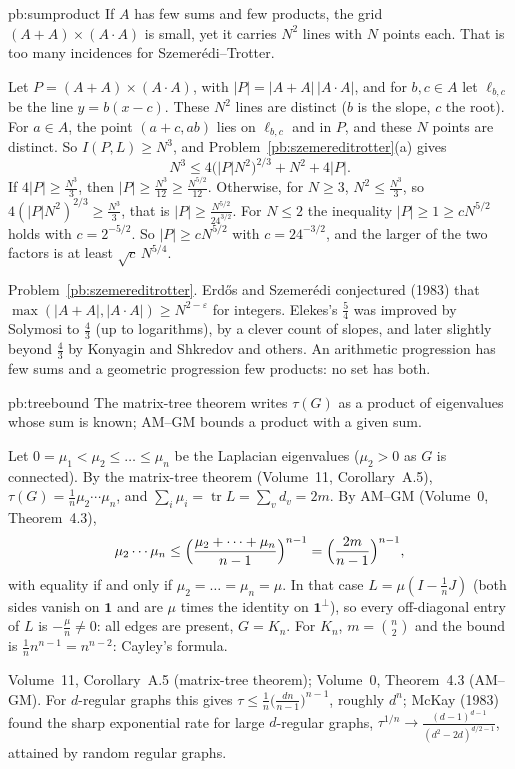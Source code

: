 \begin{solution}{pb:sumproduct}
\idea If $A$ has few sums and few products, the grid $(A+A)\times(A\cdot A)$ is small, yet it carries $N^2$ lines with $N$ points each.
That is too many incidences for Szemerédi--Trotter.

\writeup Let $P=(A+A)\times(A\cdot A)$, with $|P|=|A+A|\,|A\cdot A|$, and for $b,c\in A$ let $\ell_{b,c}$ be the line $y=b(x-c)$. These $N^2$
lines are distinct ($b$ is the slope, $c$ the root). For $a\in A$, the point $(a+c,ab)$ lies on $\ell_{b,c}$ and in $P$, and these $N$ points
are distinct. So $I(P,L)\ge N^3$, and Problem~\ref{pb:szemereditrotter}(a) gives
\[
N^3\le4\bigl(|P|N^2\bigr)^{2/3}+N^2+4|P|.
\]
If $4|P|\ge\frac{N^3}3$, then $|P|\ge\frac{N^3}{12}\ge\frac{N^{5/2}}{12}$. Otherwise, for $N\ge3$, $N^2\le\frac{N^3}3$, so
$4(|P|N^2)^{2/3}\ge\frac{N^3}3$, that is $|P|\ge\frac{N^{5/2}}{24^{3/2}}$. For $N\le2$ the inequality $|P|\ge1\ge cN^{5/2}$ holds with $c=2^{-5/2}$.
So $|P|\ge cN^{5/2}$ with $c=24^{-3/2}$, and the larger of the two factors is at least $\sqrt c\,N^{5/4}$.

\tools Problem~\ref{pb:szemereditrotter}.
\leads Erdős and Szemerédi conjectured (1983) that $\max(|A+A|,|A\cdot A|)\ge N^{2-\varepsilon}$ for integers. Elekes's $\frac54$ was improved by
Solymosi to $\frac43$ (up to logarithms), by a clever count of slopes, and later slightly beyond $\frac43$ by Konyagin and Shkredov
and others. An arithmetic progression has few sums and a geometric progression few products: no set has both.
\end{solution}

\begin{solution}{pb:treebound}
\idea The matrix-tree theorem writes $\tau(G)$ as a product of eigenvalues whose sum is known; AM--GM bounds a product with a given
sum.

\writeup Let $0=\mu_1<\mu_2\le\dots\le\mu_n$ be the Laplacian eigenvalues ($\mu_2>0$ as $G$ is connected). By the matrix-tree theorem
(Volume~11, Corollary~A.5), $\tau(G)=\frac1n\mu_2\cdots\mu_n$, and $\sum_i\mu_i=\operatorname{tr}L=\sum_vd_v=2m$. By AM--GM (Volume~0,
Theorem~4.3),
\[
\mu_2\cdots\mu_n\le\Bigl(\frac{\mu_2+\dots+\mu_n}{n-1}\Bigr)^{n-1}=\Bigl(\frac{2m}{n-1}\Bigr)^{n-1},
\]
with equality if and only if $\mu_2=\dots=\mu_n=\mu$. In that case $L=\mu(I-\frac1nJ)$ (both sides vanish on $\mathbf1$ and are $\mu$ times the
identity on $\mathbf1^\perp$), so every off-diagonal entry of $L$ is $-\frac\mu n\ne0$: all edges are present, $G=K_n$. For $K_n$,
$m=\binom n2$ and the bound is $\frac1nn^{n-1}=n^{n-2}$: Cayley's formula.

\tools Volume~11, Corollary~A.5 (matrix-tree theorem); Volume~0, Theorem~4.3 (AM--GM).
\leads For $d$-regular graphs this gives $\tau\le\frac1n\bigl(\frac{dn}{n-1}\bigr)^{n-1}$, roughly $d^n$; McKay (1983) found the sharp exponential rate
for large $d$-regular graphs, $\tau^{1/n}\to\frac{(d-1)^{d-1}}{(d^2-2d)^{d/2-1}}$, attained by random regular graphs.
\end{solution}

